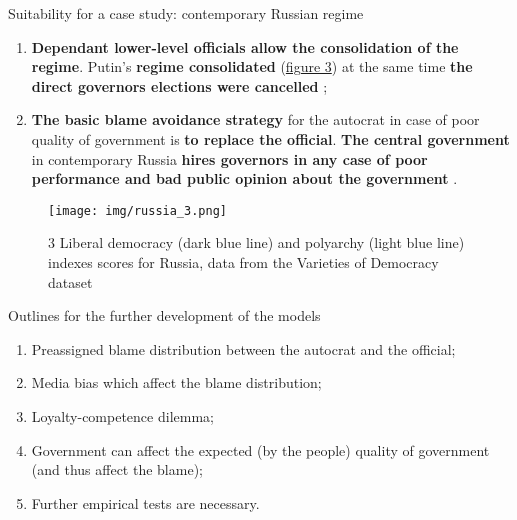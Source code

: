 \documentclass{beamer}
\begin{document}
\begin{frame}{\hypertarget{case2}{Suitability for a case study: contemporary Russian regime}}
    
    \begin{enumerate}
        
        \item \textbf{Dependant lower-level officials allow the consolidation of the regime}. Putin's \textbf{regime consolidated} (\hyperlink{russ}{figure 3}) at the same time \textbf{the direct governors elections were cancelled} \parencite{governors};
        
        \item \textbf{The basic blame avoidance strategy} for the autocrat in case of poor quality of government is \textbf{to replace the official}. \textbf{The central government} in contemporary Russia \textbf{hires governors in any case of poor performance and bad public opinion about the government} \parencite{governors2}.
        
    \end{enumerate}
    
\end{frame}

\begin{frame}[plain]
    \begin{figure}
        \centering
        \texttt{[image: img/russia\_3.png]}
        \label{rus}
        \caption{\footnotesize{3 \hypertarget{russ}{Liberal} democracy (dark blue line) and polyarchy (light blue line) indexes scores for Russia, data from the Varieties of Democracy dataset \parencite{vdem_data}}}
    \end{figure}
\end{frame}

\begin{frame}{Outlines for the further development of the models}
    
    \begin{enumerate}
    
        \item Preassigned blame distribution between the autocrat and the official;
        
        \item Media bias which affect the blame distribution;
        
        \item Loyalty-competence dilemma;
        
        \item Government can affect the expected (by the people) quality of government (and thus affect the blame);
        
        \item Further empirical tests are necessary. 
        
    \end{enumerate}
    
    
\end{frame}
\end{document}
